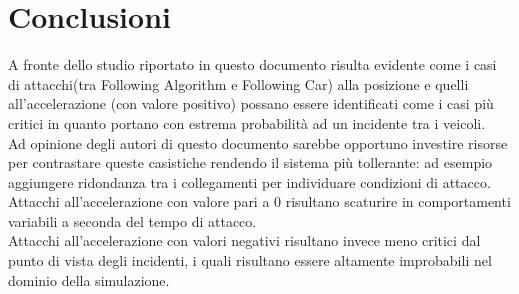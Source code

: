 \section{Conclusioni}
A fronte dello studio riportato in questo documento risulta evidente come i casi di attacchi(tra Following Algorithm e Following Car) alla posizione e quelli all'accelerazione (con valore positivo) possano essere identificati come i casi più critici in quanto portano con estrema probabilità ad un incidente tra i veicoli. \\
Ad opinione degli autori di questo documento sarebbe opportuno investire risorse per contrastare queste casistiche rendendo il sistema più tollerante: ad esempio aggiungere ridondanza tra i collegamenti per individuare condizioni di attacco. \\
Attacchi all'accelerazione con valore pari a 0 risultano scaturire in comportamenti variabili a seconda del tempo di attacco.\\
Attacchi all'accelerazione con valori negativi risultano invece meno critici dal punto di vista degli incidenti, i quali risultano essere altamente improbabili nel dominio della simulazione.